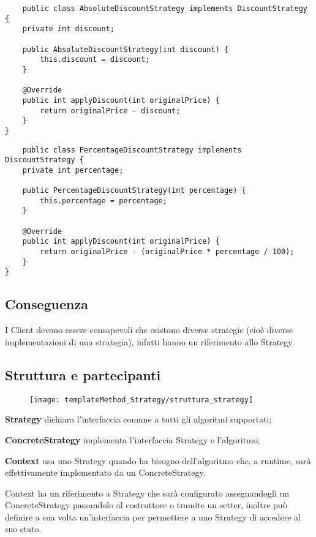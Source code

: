 \begin{multicols}{2}
\begin{lstlisting}
    public class AbsoluteDiscountStrategy implements DiscountStrategy {
    private int discount;
    
    public AbsoluteDiscountStrategy(int discount) {
        this.discount = discount;
    }

    @Override
    public int applyDiscount(int originalPrice) {
        return originalPrice - discount;
    }
}    
\end{lstlisting}
\columnbreak
\begin{lstlisting}
    public class PercentageDiscountStrategy implements DiscountStrategy {
    private int percentage;
    
    public PercentageDiscountStrategy(int percentage) {
        this.percentage = percentage;
    }

    @Override
    public int applyDiscount(int originalPrice) {
        return originalPrice - (originalPrice * percentage / 100);
    }
}
\end{lstlisting}
\end{multicols}

\subsection{Conseguenza}

I Client devono essere consapevoli che esistono diverse strategie (cioè diverse implementazioni di una strategia), infatti hanno un riferimento allo Strategy.

\subsection{Struttura e partecipanti}

\begin{figure}[H]
    \centering   
    \texttt{[image: templateMethod\_Strategy/struttura\_strategy]}    
\end{figure}

\textbf{Strategy} dichiara l’interfaccia comune a tutti gli algoritmi supportati;

\textbf{ConcreteStrategy} implementa l’interfaccia Strategy e l’algoritmo;

\textbf{Context} usa uno Strategy quando ha bisogno dell’algoritmo che, a runtime, sarà effettivamente implementato da un ConcreteStrategy.

Context ha un riferimento a Strategy che sarà configurato assegnandogli un ConcreteStrategy passandolo al costruttore o tramite un setter, inoltre può definire a sua 
volta un’interfaccia per permettere a uno Strategy di accedere al suo stato.

